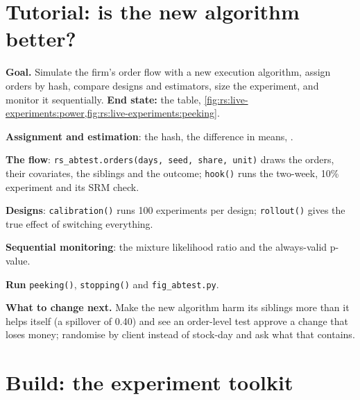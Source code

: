 \section{Tutorial: is the new algorithm better?}\label{tut:rs:live-experiments:tut}

\begin{tutorial}
\textbf{Goal.} Simulate the firm's order flow with a new execution algorithm, assign orders by hash, compare designs and estimators, size the experiment, and
monitor it sequentially. \textbf{End state:} the table, \cref{fig:rs:live-experiments:power,fig:rs:live-experiments:peeking}.
\begin{tutsteps}
\item \textbf{Assignment and estimation}: the hash, the difference in means, .
\label{lst:rs:live-experiments:assign}
\item \textbf{The flow}: \texttt{rs\_abtest.orders(days, seed, share, unit)} draws the orders, their covariates, the siblings and the outcome; \texttt{hook()}
runs the two-week, 10\% experiment and its SRM check.
\item \textbf{Designs}: \texttt{calibration()} runs 100 experiments per design; \texttt{rollout()} gives the true effect of switching everything.
\item \textbf{Sequential monitoring}: the mixture likelihood ratio and the always-valid p-value.
\label{lst:rs:live-experiments:msprt}
\item \textbf{Run} \texttt{peeking()}, \texttt{stopping()} and \texttt{fig\_abtest.py}.
\end{tutsteps}
\textbf{What to change next.} Make the new algorithm harm its siblings more than it helps itself (a spillover of 0.40) and see an order-level test approve a
change that loses money; randomise by client instead of stock-day and ask what  that contains.
\end{tutorial}

\section{Build: the experiment toolkit}\label{bld:rs:live-experiments:abtest}

